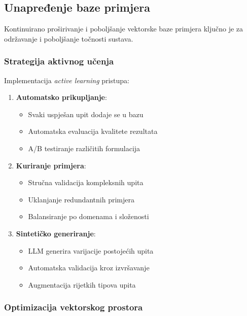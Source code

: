 \subsection{Unapređenje baze primjera}

Kontinuirano proširivanje i poboljšanje vektorske baze primjera ključno je za održavanje i poboljšanje točnosti sustava.

\subsubsection{Strategija aktivnog učenja}

Implementacija \textit{active learning} pristupa:

\begin{enumerate}
    \item \textbf{Automatsko prikupljanje}:
    \begin{itemize}
        \item Svaki uspješan upit dodaje se u bazu
        \item Automatska evaluacija kvalitete rezultata
        \item A/B testiranje različitih formulacija
    \end{itemize}
    
    \item \textbf{Kuriranje primjera}:
    \begin{itemize}
        \item Stručna validacija kompleksnih upita
        \item Uklanjanje redundantnih primjera
        \item Balansiranje po domenama i složenosti
    \end{itemize}
    
    \item \textbf{Sintetičko generiranje}:
    \begin{itemize}
        \item LLM generira varijacije postojećih upita
        \item Automatska validacija kroz izvršavanje
        \item Augmentacija rijetkih tipova upita
    \end{itemize}
\end{enumerate}

\subsubsection{Optimizacija vektorskog prostora}

